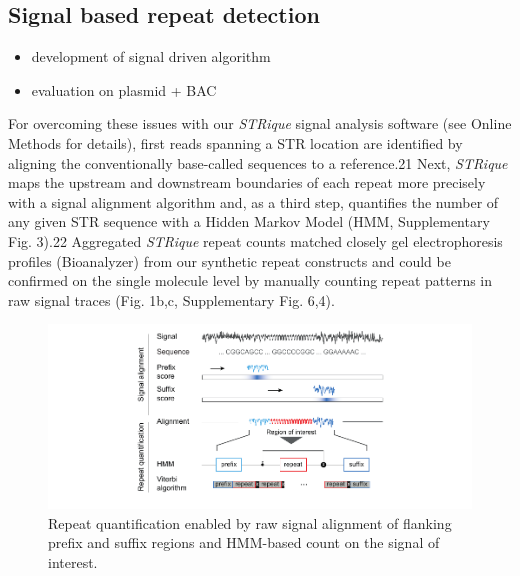 \subsection{Signal based repeat detection}
\label{subsec:strique:sig_repeat_counts}

\begin{itemize}
	\item development of signal driven algorithm
	\item evaluation on plasmid + BAC
\end{itemize}

For overcoming these issues with our \textit{STRique} signal analysis software (see Online Methods for details), first reads spanning a STR location are identified by aligning the conventionally base-called sequences to a reference.21 Next, \textit{STRique} maps the upstream and downstream boundaries of each repeat more precisely with a signal alignment algorithm and, as a third step, quantifies the number of any given STR sequence with a Hidden Markov Model (HMM, Supplementary Fig. 3).22 Aggregated \textit{STRique} repeat counts matched closely gel electrophoresis profiles (Bioanalyzer) from our synthetic repeat constructs and could be confirmed on the single molecule level by manually counting repeat patterns in raw signal traces (Fig. 1b,c, Supplementary Fig. 6,4).

\begin{figure}[h]
	\centering
	\includegraphics[width=1.0\textwidth]{figures/strique/count_structure_plasmid.pdf}
	\captionsetup{format=plain}
	\caption[\textit{STRique}: generic repeat detection pipeline on raw nanopore signals.]{Repeat quantification enabled by raw signal alignment of flanking prefix and suffix regions and HMM-based count on the signal of interest.}
	\label{fig:strique:count_structure_plasmid}
\end{figure}

